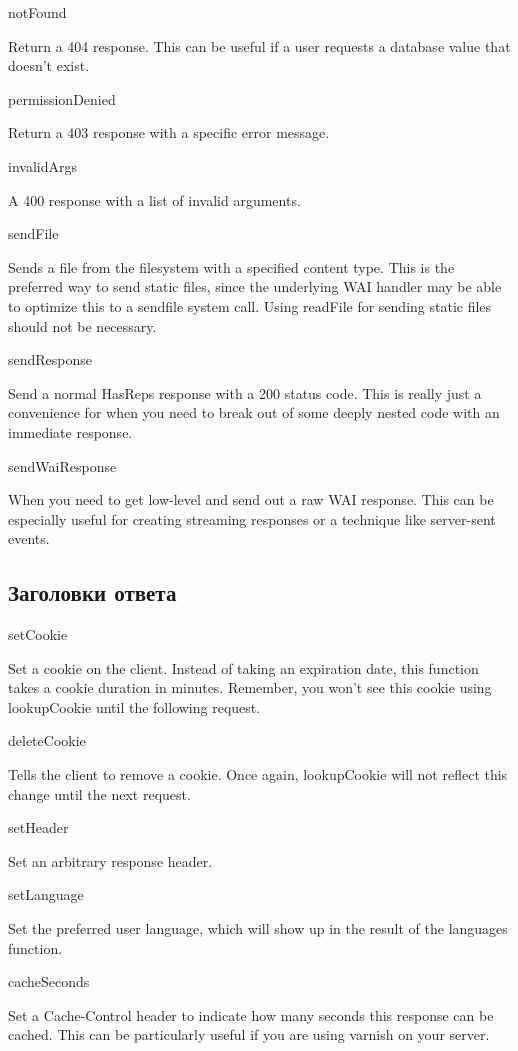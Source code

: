 notFound

Return a 404 response. This can be useful if a user requests a
database value that doesn't exist.

permissionDenied

Return a 403 response with a specific error message.

invalidArgs

A 400 response with a list of invalid arguments.

sendFile

Sends a file from the filesystem with a specified content type. This
is the preferred way to send static files, since the underlying WAI
handler may be able to optimize this to a sendfile system call. Using
readFile for sending static files should not be necessary.

sendResponse

Send a normal HasReps response with a 200 status code. This is really
just a convenience for when you need to break out of some deeply
nested code with an immediate response.

sendWaiResponse

When you need to get low-level and send out a raw WAI response. This
can be especially useful for creating streaming responses or a
technique like server-sent events.

\subsection{Заголовки ответа}

setCookie

Set a cookie on the client. Instead of taking an expiration date, this
function takes a cookie duration in minutes. Remember, you won't see
this cookie using lookupCookie until the following request.

deleteCookie

Tells the client to remove a cookie. Once again, lookupCookie will not
reflect this change until the next request.

setHeader

Set an arbitrary response header.

setLanguage

Set the preferred user language, which will show up in the result of
the languages function.

cacheSeconds

Set a Cache-Control header to indicate how many seconds this response
can be cached. This can be particularly useful if you are using
varnish on your server.

